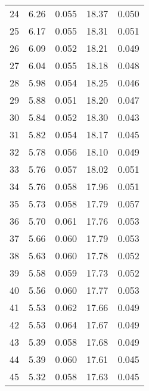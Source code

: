 \begin{table}
\begin{tabular}{c|ll|ll}
24 & 6.26 & 0.055 & 18.37 & 0.050 \\
25 & 6.17 & 0.055 & 18.31 & 0.051 \\
26 & 6.09 & 0.052 & 18.21 & 0.049 \\
27 & 6.04 & 0.055 & 18.18 & 0.048 \\
28 & 5.98 & 0.054 & 18.25 & 0.046 \\
29 & 5.88 & 0.051 & 18.20 & 0.047 \\
30 & 5.84 & 0.052 & 18.30 & 0.043 \\
31 & 5.82 & 0.054 & 18.17 & 0.045 \\
32 & 5.78 & 0.056 & 18.10 & 0.049 \\
33 & 5.76 & 0.057 & 18.02 & 0.051 \\
34 & 5.76 & 0.058 & 17.96 & 0.051 \\
35 & 5.73 & 0.058 & 17.79 & 0.057 \\
36 & 5.70 & 0.061 & 17.76 & 0.053 \\
37 & 5.66 & 0.060 & 17.79 & 0.053 \\
38 & 5.63 & 0.060 & 17.78 & 0.052 \\
39 & 5.58 & 0.059 & 17.73 & 0.052 \\
40 & 5.56 & 0.060 & 17.77 & 0.053 \\
41 & 5.53 & 0.062 & 17.66 & 0.049 \\
42 & 5.53 & 0.064 & 17.67 & 0.049 \\
43 & 5.39 & 0.058 & 17.68 & 0.049 \\
44 & 5.39 & 0.060 & 17.61 & 0.045 \\
45 & 5.32 & 0.058 & 17.63 & 0.045 \\
               \hline
        \end{tabular}
    \end{table}
    \clearpage

